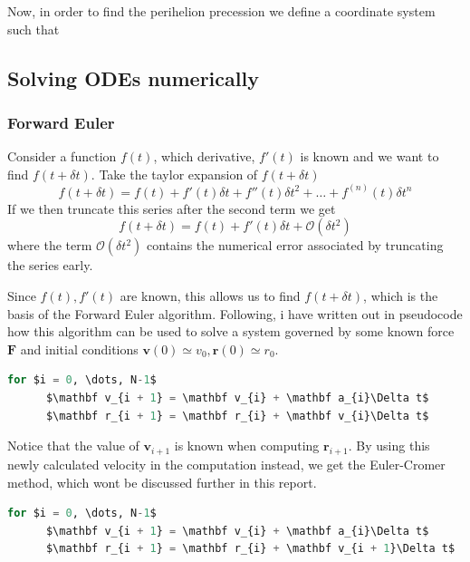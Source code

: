 \documentclass[10pt,showpacs,preprintnumbers,footinbib,amsmath,amssymb,aps,prl,twocolumn,groupedaddress,superscriptaddress,showkeys]{revtex4-1}
\begin{document}
      Now, in order to find the perihelion precession we define a coordinate system such that 

\subsection{Solving ODEs numerically}
  \subsubsection{Forward Euler}
    Consider a function $f(t)$, which derivative, $f'(t)$ is known and we want to find $f(t + \delta t)$. 
    Take the taylor expansion of $f(t + \delta t)$
    \begin{equation}
      f(t + \delta t) = f(t) + f'(t)\delta t + f''(t)\delta t^2 + \dots + f^{(n)}(t)\delta t^n
    \end{equation}
    If we then truncate this series after the second term we get
    \begin{equation}
      f(t + \delta t) = f(t) + f'(t)\delta t + \mathcal O(\delta t^2)
    \end{equation}
    where the term $\mathcal O(\delta t^2)$ contains the numerical error associated by truncating the series early.

    Since $f(t), f'(t)$ are known, this allows us to find $f(t + \delta t)$, which is the basis of the Forward Euler algorithm. Following, i have written out in pseudocode how this algorithm can be used to solve a system governed by some known force $\mathbf F$ and initial conditions $\mathbf v(0) \simeq v_0, \mathbf r(0) \simeq r_0$.

    \begin{lstlisting}[mathescape=true, language=python, title=Forward Euler Algorithm]
  for $i = 0, \dots, N-1$
      $\mathbf v_{i + 1} = \mathbf v_{i} + \mathbf a_{i}\Delta t$
      $\mathbf r_{i + 1} = \mathbf r_{i} + \mathbf v_{i}\Delta t$
  \end{lstlisting}

  Notice that the value of $\mathbf v_{i+1}$ is known when computing $\mathbf r_{i+1}$. By using this newly calculated velocity in the computation instead, we get the Euler-Cromer method, which wont be discussed further in this report.

  \begin{lstlisting}[mathescape=true, language=python, title=Euler-Cromer Algorithm]
  for $i = 0, \dots, N-1$
      $\mathbf v_{i + 1} = \mathbf v_{i} + \mathbf a_{i}\Delta t$
      $\mathbf r_{i + 1} = \mathbf r_{i} + \mathbf v_{i + 1}\Delta t$
  \end{lstlisting}
\end{document}
